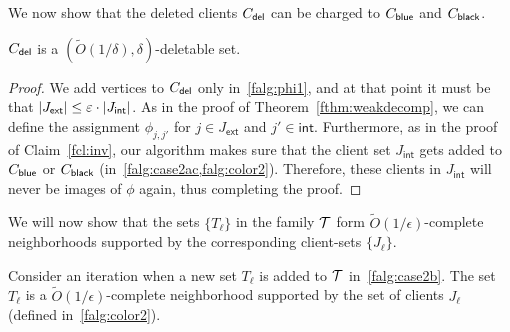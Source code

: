 We now show that the deleted clients $C_{\mathsf{del}}$ can be charged to $C_{\mathsf{blue}}$ and $C_{\mathsf{black}}$.
\begin{claim} \label{fcl:phi-augment}
$C_{\mathsf{del}}$ is a $(\tilde{O}(1/\delta),\delta)$-deletable set.
\end{claim}
\begin{proof}
	We add vertices to $C_{\mathsf{del}}$ only in~\cref{falg:phi1}, and at that point it must be that $|J_\mathsf{ext}| \leq \varepsilon\cdot |J_\mathsf{int}|$.
	As in the proof of Theorem~\ref{fthm:weakdecomp}, we can define the assignment $\phi_{j,j'}$ for $j\in J_\mathsf{ext}$ and $j' \in \mathsf{int}$.
Furthermore, as in the proof of Claim~\ref{fcl:inv}, our algorithm makes sure that the client set $J_\mathsf{int}$ gets added to $C_{\mathsf{blue}}$ or $C_{\mathsf{black}}$ (in~\cref{falg:case2ac,falg:color2}).
Therefore, these clients in $J_\mathsf{int}$ will never be images of $\phi$ again, thus completing the proof.
\end{proof}


We will now show that the sets $\{T_\ell\}$ in the family ${\cal T}$ form $\tilde{O}(1/\epsilon)$-complete neighborhoods supported by the corresponding client-sets $\{J_\ell\}$.
\begin{lemma} \label{flem:local}
Consider an iteration when a new set $T_\ell$ is added to ${\cal T}$ in~\cref{falg:case2b}. The set $T_\ell$ is a $\tilde{O}(1/\epsilon)$-complete neighborhood supported by the set of clients $J_\ell$ (defined in~\cref{falg:color2}).
\end{lemma}

